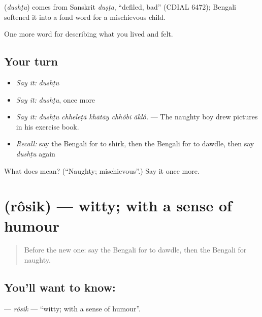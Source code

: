 \begin{cousinweb}
\textbf{} (\emph{dushṭu}) comes from Sanskrit \emph{duṣṭa}, \textquotedblleft{}defiled, bad\textquotedblright{} (CDIAL 6472); Bengali softened it into a fond word for a mischievous child.
\end{cousinweb}

\begin{grammarlens}[title={What you've built}]
One more word for describing what you lived and felt.
\end{grammarlens}

\subsection*{Your turn}
\begin{itemize}
\raggedright
  \item \emph{Say it:} \emph{dushṭu}
  \item \emph{Say it:} \emph{dushṭu}, once more
  \item \emph{Say it:} \emph{dushṭu chheleṭā khātāy chhôbi ā̃klô.} — The naughty boy drew pictures in his exercise book.
  \item \emph{Recall:} say the Bengali for to shirk, then the Bengali for to dawdle, then say \emph{dushṭu} again
\end{itemize}

\begin{tcolorbox}[breakable,colback=teal!4,colframe=teal!35!black,title={Before you move on}]
What does  mean? (\textquotedblleft{}Naughty; mischievous\textquotedblright{}.) Say it once more.
\end{tcolorbox}
\section[\texorpdfstring{\bn{রসিক} (rôsik)}{রসিক (rôsik)}]{ (rôsik) — witty; with a sense of humour}

\label{lesson:BN-C463-rosik}



\begin{quote}
Before the new one: say the Bengali for to dawdle, then the Bengali for naughty.
\end{quote}

\subsection*{You'll want to know: }
\textbf{} — \emph{rôsik} — \textquotedblleft{}witty; with a sense of humour\textquotedblright{}.

